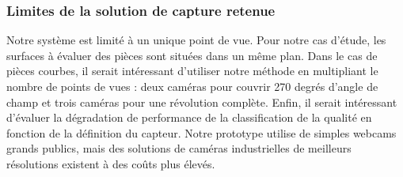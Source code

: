 
\subsubsection{Limites de la solution de capture retenue}
Notre système est limité à un unique point de vue.
Pour notre cas d'étude, les surfaces à évaluer des pièces sont situées dans un même plan.
Dans le cas de pièces courbes, il serait intéressant d’utiliser notre méthode en multipliant le nombre de points de vues : deux caméras pour couvrir 270 degrés d’angle de champ et trois caméras pour une révolution complète.
Enfin, il serait intéressant d’évaluer la dégradation de performance de la classification de la qualité en fonction de la définition du capteur.
Notre prototype utilise de simples webcams grands publics, mais des solutions de caméras industrielles de meilleurs résolutions existent à des coûts plus élevés.



